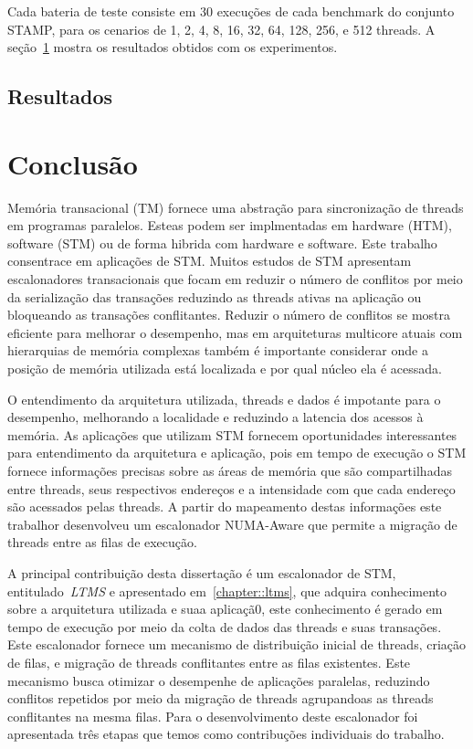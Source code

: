 \documentclass[diss,capa]{texufpel}
\begin{document}
Cada bateria de teste consiste em 30 execuções de cada benchmark do conjunto STAMP, para os cenarios de 1, 2, 4, 8, 16, 32, 64, 128, 256, e 512 threads. A seção~\ref{resultados} mostra os resultados obtidos com os experimentos.

\section{Resultados}
\label{resultados}









\chapter{Conclusão}
\label{chapter::conclusao}

Memória transacional (TM) fornece uma abstração para sincronização de threads em programas paralelos. Esteas podem ser implmentadas em hardware (HTM), software (STM) ou de forma hibrida com hardware e software. Este trabalho consentrace em aplicações de STM. Muitos estudos de STM apresentam escalonadores transacionais que focam em reduzir o número de conflitos por meio da serialização das transações reduzindo as threads ativas na aplicação ou bloqueando as transações conflitantes. Reduzir o número de conflitos se mostra eficiente para melhorar o desempenho, mas em arquiteturas multicore atuais com hierarquias de memória complexas também é importante considerar onde a posição de memória utilizada está localizada e por qual núcleo ela é acessada.

O entendimento da arquitetura utilizada, threads e dados é impotante para o desempenho, melhorando a localidade e reduzindo a latencia dos acessos à memória. As aplicações que utilizam STM fornecem oportunidades interessantes para entendimento da arquitetura e aplicação, pois em tempo de execução o STM fornece informações precisas sobre as áreas de memória que são compartilhadas entre threads, seus respectivos endereços e a intensidade com que cada endereço são acessados pelas threads. A partir do mapeamento destas informações este trabalhor desenvolveu um escalonador NUMA-Aware que permite a migração de threads entre as filas de execução.

A principal contribuição desta dissertação é um escalonador de STM, entitulado~\emph{LTMS} e apresentado em~\ref{chapter::ltms}, que adquira conhecimento sobre a arquitetura utilizada e suaa aplicaçã0, este conhecimento é gerado em tempo de execução por meio da colta de dados das threads e suas transações. Este escalonador fornece um mecanismo de distribuição inicial de threads, criação de filas, e migração de threads conflitantes entre as filas existentes. Este mecanismo busca otimizar o desempenhe de aplicações paralelas, reduzindo conflitos repetidos por meio da migração de threads agrupandoas as threads conflitantes na mesma filas. Para o desenvolvimento deste escalonador foi apresentada três etapas que temos como contribuções individuais do trabalho.
\end{document}
